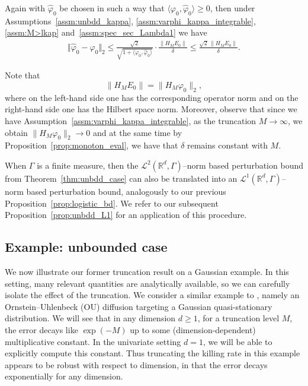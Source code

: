 \documentclass{aptpub}
\begin{document}
\begin{theorem}
Again with $\widehat \varphi_0$ be chosen in such a way that $\langle \varphi_0, \widehat \varphi_0\rangle \geq 0$, then under Assumptions~\ref{assm:unbdd_kappa}, \ref{assm:varphi_kappa_integrable}, \ref{assm:M>lkap} and~\ref{assm:spec_sec_Lambda1} we have
    \begin{equation*}
    \begin{split}
        \Vert \widehat \varphi_0 - \varphi_0\Vert_2 \le \frac{\sqrt 2 }{\sqrt{1+\langle \varphi_0, \widehat \varphi_0\rangle}} \cdot \frac{\|H_M E_0\|}{\delta} \le \frac{\sqrt 2 \,\|H_M E_0\|}{\delta}.
    \end{split}
    \end{equation*}
    \label{thm:unbdd_case}
\end{theorem}
Note that
\begin{equation*}
    \|H_M E_0\| = \|H_M \varphi_0\|_2,
\end{equation*}
where on the left-hand side one has the corresponding operator norm and on the right-hand side one has the Hilbert space norm.
Moreover, observe that since we have Assumption~\ref{assm:varphi_kappa_integrable}, as the truncation $M\to \infty$, we obtain $\|H_M \varphi_0\|_2 \to 0$ and at the same time by Proposition~\ref{prop:monoton_eval}, we have that $\delta$ remains constant with $M$.

\begin{remark}
    When $\Gamma$ is a finite measure, then the $\mathcal{L}^2(\mathbb{R}^d,\Gamma)$--norm based perturbation bound from Theorem~\ref{thm:unbdd_case} can also be translated into an $\mathcal{L}^1(\mathbb{R}^d,\Gamma)$--norm based perturbation bound, analogously to our previous Proposition~\ref{prop:logistic_bd}. We refer to our subsequent Proposition~\ref{prop:unbdd_L1} for an application of this procedure.
\end{remark}

\subsection{Example: unbounded case}
\label{sec:example_unbdd}

We now illustrate our former truncation result on a Gaussian example. In this setting, many relevant quantities are analytically available, so we can carefully isolate the effect of the truncation. We consider a similar example to \cite{Wang2019TheoQSMC}, namely an Ornstein--Uhlenbeck (OU) diffusion targeting a Gaussian quasi-stationary distribution. We will see that in any dimension $d\ge 1$, for a truncation level $M$, the error decays like $\exp(-M)$ up to some (dimension-dependent) multiplicative constant. In the univariate setting $d=1$, we will be able to explicitly compute this constant. Thus truncating the killing rate in this example appears to be robust with respect to dimension, in that the error decays exponentially for any dimension.
\end{document}
